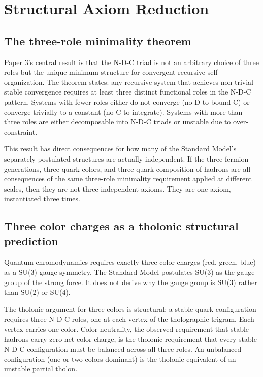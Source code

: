 \documentclass[12pt]{article}
\begin{document}
\section{Structural Axiom Reduction}\label{structural-axiom-reduction}

\subsection{The three-role minimality theorem}\label{the-three-role-minimality-theorem}

Paper 3's central result is that the N-D-C triad is not an arbitrary
choice of three roles but the unique minimum structure for convergent
recursive self-organization. The theorem states: any recursive system
that achieves non-trivial stable convergence requires at least three
distinct functional roles in the N-D-C pattern. Systems with fewer roles
either do not converge (no D to bound C) or converge trivially to a
constant (no C to integrate). Systems with more than three roles are
either decomposable into N-D-C triads or unstable due to
over-constraint.

This result has direct consequences for how many of the Standard Model's
separately postulated structures are actually independent. If the three
fermion generations, three quark colors, and three-quark composition of
hadrons are all consequences of the same three-role minimality
requirement applied at different scales, then they are not three
independent axioms. They are one axiom, instantiated three times.

\subsection{Three color charges as a tholonic structural prediction}\label{three-color-charges-as-a-tholonic-structural-prediction}

Quantum chromodynamics requires exactly three color charges (red, green,
blue) as a SU(3) gauge symmetry. The Standard Model postulates SU(3) as
the gauge group of the strong force. It does not derive why the gauge
group is SU(3) rather than SU(2) or SU(4).

The tholonic argument for three colors is structural: a stable quark
configuration requires three N-D-C roles, one at each vertex of the
tholographic trigram. Each vertex carries one color. Color neutrality,
the observed requirement that stable hadrons carry zero net color
charge, is the tholonic requirement that every stable N-D-C
configuration must be balanced across all three roles. An unbalanced
configuration (one or two colors dominant) is the tholonic equivalent of
an unstable partial tholon.
\end{document}
